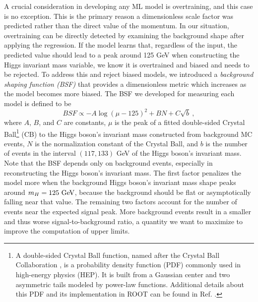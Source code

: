 \begin{myitemlist}
    A crucial consideration in developing any ML model is overtraining, and this case is no exception. This is the primary reason a dimensionless scale factor was predicted rather than the direct value of the momentum. In our situation, overtraining can be directly detected by examining the background shape after applying the regression. If the model learns that, regardless of the input, the predicted value should lead to a peak around 125 GeV when constructing the Higgs invariant mass variable, we know it is overtrained and biased and needs to be rejected. To address this and reject biased models, we introduced a \textit{background shaping function (BSF)} that provides a dimensionless metric which increases as the model becomes more biased. The BSF we developed for measuring each model is defined to be
    \begin{equation*}
        BSF \propto -A\log{(\mu-125)^2} + B N + C \sqrt{b}\ ,
    \end{equation*}
    where $A$, $B$, and $C$ are constants, $\mu$ is the peak of a fitted double-sided Crystal Ball\footnote{A double-sided Crystal Ball function, named after the Crystal Ball Collaboration \cite{A2:CB}, is a probability density function (PDF) commonly used in high-energy physics (HEP). It is built from a Gaussian center and two asymmetric tails modeled by power-law functions. Additional details about this PDF and its implementation in ROOT can be found in Ref. \cite{CERN:root_CB}.} (CB) to the Higgs boson's invariant mass constructed from background MC events, $N$ is the normalization constant of the Crystal Ball, and $b$ is the number of events in the interval $(117, 133)$ GeV of the Higgs boson's invariant mass. Note that the BSF depends only on background events, especially in reconstructing the Higgs boson's invariant mass. The first factor penalizes the model more when the background Higgs boson's invariant mass shape peaks around $m_H=125\ \text{GeV}$, because the background should be flat or asymptotically falling near that value. The remaining two factors account for the number of events near the expected signal peak. More background events result in a smaller and thus worse signal-to-background ratio, a quantity we want to maximize to improve the computation of upper limits.


\end{myitemlist}
